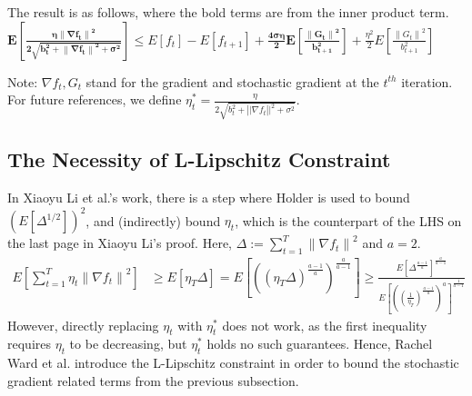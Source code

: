 \documentclass[14pt,onecolumn,letterpaper]{extarticle}
\begin{document}
    The result is as follows, where the bold terms are from the inner product term. 
    $\boldsymbol{E\left[\frac{\eta\left\|\nabla f_t\right\|^2}{2 \sqrt{b_t^2+\left\|\nabla f_t\right\|^2+\sigma^2}}\right]} \leq E\left[f_t\right]-E\left[f_{t+1}\right]+\boldsymbol{\frac{4 \sigma\eta}{2} E\left[\frac{\left\|G_t\right\|^2}{b_{t+1}^2}\right]}+ \frac{\eta^2 }{2} E\left[\frac{\left\|G_t\right\|^2}{b_{t+1}^2}\right]$\par
    Note: $\nabla f_t, G_t$ stand for the gradient and stochastic gradient at the $t^{th}$ iteration. For future references, we define $\eta_t^* = \frac{\eta}{2\sqrt{b_t^2+\left||\nabla f_t\right||^2+\sigma^2}}$.
\subsection{The Necessity of L-Lipschitz Constraint}
In Xiaoyu Li et al.'s work, there is a step where Holder is used to bound $\left(E\left[\Delta^{1 / 2}\right]\right)^{2}$, and (indirectly) bound $\eta_t$, which is the counterpart of the LHS on the last page in Xiaoyu Li's proof. Here, $\Delta:=\sum_{t=1}^T\left\|\nabla f_t\right\|^2$ and $a = 2$.
    \\$\begin{aligned} E\left[\sum_{t=1}^T \eta_t\left\|\nabla f_t\right\|^2\right] & \geq E\left[\eta_T \Delta\right]=E\left[\left(\left(\eta_T \Delta\right)^{\frac{a-1}{a}}\right)^{\frac{a}{a-1}}\right]\geq\frac{E\left[\Delta^{\frac{a-1}{a}}\right]^{\frac{a}{a-1}}}{E\left[\left(\left(\frac{1}{\eta_T}\right)^{\frac{a-1}{a}}\right)^{a}\right]^{\frac{1}{a-1}}}\end{aligned}$ \\  
    However, directly replacing $\eta_t$ with $\eta_t^*$ does not work, as the first inequality requires $\eta_t$ to be decreasing, but $\eta_t^*$ holds no such guarantees.
    Hence, Rachel Ward et al. introduce the L-Lipschitz constraint in order to bound the stochastic gradient related terms from the previous subsection.
\end{document}
